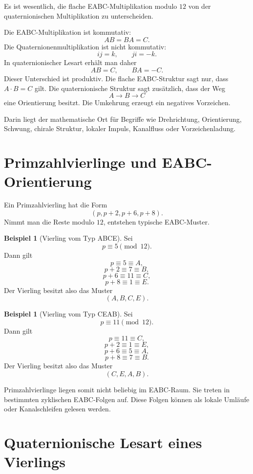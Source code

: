 \documentclass[11pt,a4paper]{article}
\theoremstyle{definition}
\newtheorem{beispiel}[definition]{Beispiel}
\theoremstyle{plain}
\begin{document}
	Es ist wesentlich, die flache EABC-Multiplikation modulo $12$ von der quaternionischen Multiplikation zu unterscheiden.
	
	Die EABC-Multiplikation ist kommutativ:
	\[
	AB=BA=C.
	\]
	Die Quaternionenmultiplikation ist nicht kommutativ:
	\[
	ij=k,
	\qquad
	ji=-k.
	\]
	In quaternionischer Lesart erhält man daher
	\[
	AB=C,
	\qquad
	BA=-C.
	\]
	Dieser Unterschied ist produktiv. Die flache EABC-Struktur sagt nur, dass $A\cdot B=C$ gilt. Die quaternionische Struktur sagt zusätzlich, dass der Weg
	\[
	A\to B\to C
	\]
	eine Orientierung besitzt. Die Umkehrung erzeugt ein negatives Vorzeichen.
	
	Darin liegt der mathematische Ort für Begriffe wie Drehrichtung, Orientierung, Schwung, chirale Struktur, lokaler Impuls, Kanalfluss oder Vorzeichenladung.
	
	\section{Primzahlvierlinge und EABC-Orientierung}
	
	Ein Primzahlvierling hat die Form
	\[
	(p,p+2,p+6,p+8).
	\]
	Nimmt man die Reste modulo $12$, entstehen typische EABC-Muster.
	
	\begin{beispiel}[Vierling vom Typ ABCE]
		Sei
		\[
		p\equiv 5\pmod{12}.
		\]
		Dann gilt
		\[
		p\equiv 5\equiv A,
		\]
		\[
		p+2\equiv 7\equiv B,
		\]
		\[
		p+6\equiv 11\equiv C,
		\]
		\[
		p+8\equiv 1\equiv E.
		\]
		Der Vierling besitzt also das Muster
		\[
		(A,B,C,E).
		\]
	\end{beispiel}
	
	\begin{beispiel}[Vierling vom Typ CEAB]
		Sei
		\[
		p\equiv 11\pmod{12}.
		\]
		Dann gilt
		\[
		p\equiv 11\equiv C,
		\]
		\[
		p+2\equiv 1\equiv E,
		\]
		\[
		p+6\equiv 5\equiv A,
		\]
		\[
		p+8\equiv 7\equiv B.
		\]
		Der Vierling besitzt also das Muster
		\[
		(C,E,A,B).
		\]
	\end{beispiel}
	
	Primzahlvierlinge liegen somit nicht beliebig im EABC-Raum. Sie treten in bestimmten zyklischen EABC-Folgen auf. Diese Folgen können als lokale Umläufe oder Kanalschleifen gelesen werden.
	
	\section{Quaternionische Lesart eines Vierlings}
	
\end{document}
